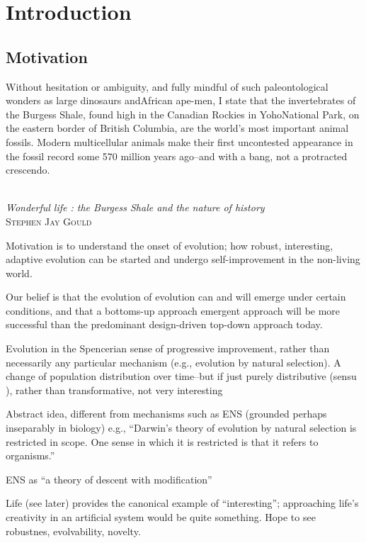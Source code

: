 \chapter{Introduction}\label{introduction}

\section{Motivation}\label{motivation}

\settowidth{\epigraphwidth}{Wonderful life : the Burgess Shale and the nature of history}
\epigraph{%
Without hesitation or ambiguity, and fully mindful of such paleontological wonders as large dinosaurs andAfrican ape-men, I state that the invertebrates of the Burgess Shale, found high in the Canadian Rockies in YohoNational Park, on the eastern border of British Columbia, are the world's most important animal fossils. Modern multicellular animals make their first uncontested appearance in the fossil record some 570 million years ago--and with a bang, not a protracted crescendo.}%
{\textit{\\Wonderful life : the Burgess Shale and the nature of history}\\\textsc{Stephen Jay Gould}}

Motivation is to understand the onset of evolution; how robust, interesting, adaptive evolution can be started and undergo self-improvement in the non-living world.

Our belief is that the evolution of evolution can and will emerge under certain conditions, and that a bottoms-up approach emergent approach will be more successful than the predominant design-driven top-down approach today.

Evolution in the Spencerian sense of progressive improvement, rather than necessarily any particular mechanism (e.g., evolution by natural selection). A change of population distribution over time--but if just purely distributive (sensu \autocite{Bourrat2015}), rather than transformative, not very interesting

Abstract idea, different from mechanisms such as ENS (grounded perhaps inseparably in biology) e.g., ``Darwin's theory of evolution by natural selection is restricted in scope. One sense in which it is restricted is that it refers to organisms.'' \autocite{Griesemer2005}

ENS as ``a theory of descent with modification''

Life (see later) provides the canonical example of ``interesting''; approaching life's creativity in an artificial system would be quite something.  Hope to see robustnes,  evolvability, novelty.

